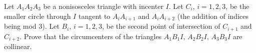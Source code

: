 Let $A_1 A_2 A_3$ be a nonisosceles triangle with incenter $I$. Let $C_i$, $i = 1, 2, 3$, be the smaller circle through $I$ tangent to $A_i A_{i+1}$ and $A_i A_{i+2}$ (the addition of indices being mod 3). Let $B_i$, $i = 1, 2, 3$, be the second point of intersection of $C_{i+1}$ and $C_{i+2}$. Prove that the circumcenters of the triangles $A_1 B_1 I$, $A_2 B_2 I$, $A_3 B_3 I$ are collinear.
